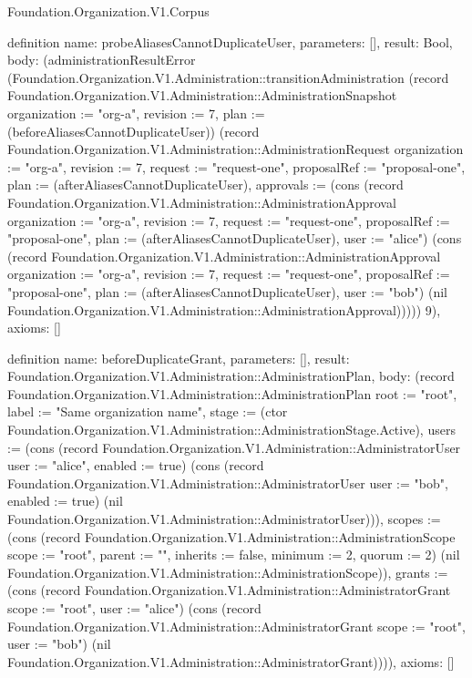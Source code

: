 \begin{lexlean}{Foundation.Organization.V1.Corpus}
\begin{semanticmodule}
definition{
  name: probeAliasesCannotDuplicateUser,
  parameters: [],
  result: Bool,
  body: (administrationResultError (Foundation.Organization.V1.Administration::transitionAdministration (record Foundation.Organization.V1.Administration::AdministrationSnapshot {organization := "org-a", revision := 7, plan := (beforeAliasesCannotDuplicateUser)}) (record Foundation.Organization.V1.Administration::AdministrationRequest {organization := "org-a", revision := 7, request := "request-one", proposalRef := "proposal-one", plan := (afterAliasesCannotDuplicateUser), approvals := (cons (record Foundation.Organization.V1.Administration::AdministrationApproval {organization := "org-a", revision := 7, request := "request-one", proposalRef := "proposal-one", plan := (afterAliasesCannotDuplicateUser), user := "alice"}) (cons (record Foundation.Organization.V1.Administration::AdministrationApproval {organization := "org-a", revision := 7, request := "request-one", proposalRef := "proposal-one", plan := (afterAliasesCannotDuplicateUser), user := "bob"}) (nil Foundation.Organization.V1.Administration::AdministrationApproval)))})) 9),
  axioms: []
}

definition{
  name: beforeDuplicateGrant,
  parameters: [],
  result: Foundation.Organization.V1.Administration::AdministrationPlan,
  body: (record Foundation.Organization.V1.Administration::AdministrationPlan {root := "root", label := "Same organization name", stage := (ctor Foundation.Organization.V1.Administration::AdministrationStage.Active), users := (cons (record Foundation.Organization.V1.Administration::AdministratorUser {user := "alice", enabled := true}) (cons (record Foundation.Organization.V1.Administration::AdministratorUser {user := "bob", enabled := true}) (nil Foundation.Organization.V1.Administration::AdministratorUser))), scopes := (cons (record Foundation.Organization.V1.Administration::AdministrationScope {scope := "root", parent := "", inherits := false, minimum := 2, quorum := 2}) (nil Foundation.Organization.V1.Administration::AdministrationScope)), grants := (cons (record Foundation.Organization.V1.Administration::AdministratorGrant {scope := "root", user := "alice"}) (cons (record Foundation.Organization.V1.Administration::AdministratorGrant {scope := "root", user := "bob"}) (nil Foundation.Organization.V1.Administration::AdministratorGrant)))}),
  axioms: []
}


\end{semanticmodule}
\end{lexlean}
